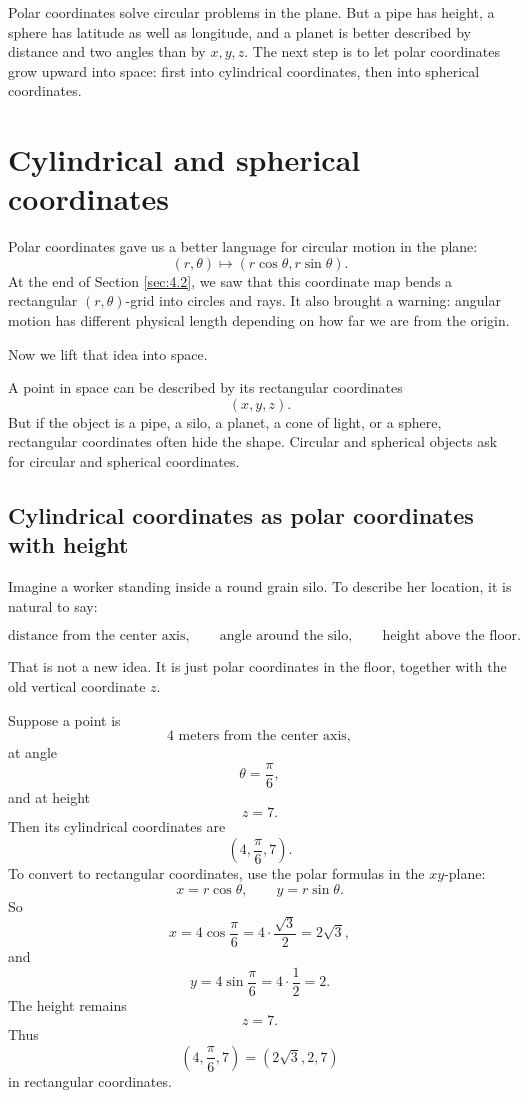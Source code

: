 Polar coordinates solve circular problems in the plane.  But a pipe has height, a sphere
has latitude as well as longitude, and a planet is better described by distance and two
angles than by \(x,y,z\).  The next step is to let polar coordinates grow upward into
space: first into cylindrical coordinates, then into spherical coordinates.
\section{Cylindrical and spherical coordinates}
\label{sec:4.3}

Polar coordinates gave us a better language for circular motion in the plane:
\[
    (r,\theta)\longmapsto (r\cos\theta,r\sin\theta).
\]
At the end of Section \ref{sec:4.2}, we saw that this coordinate map bends a rectangular
\((r,\theta)\)-grid into circles and rays.  It also brought a warning: angular motion has
different physical length depending on how far we are from the origin.

Now we lift that idea into space.

A point in space can be described by its rectangular coordinates
\[
    (x,y,z).
\]
But if the object is a pipe, a silo, a planet, a cone of light, or a sphere, rectangular
coordinates often hide the shape.  Circular and spherical objects ask for circular and
spherical coordinates.

\subsection{Cylindrical coordinates as polar coordinates with height}

Imagine a worker standing inside a round grain silo.  To describe her location, it is
natural to say:

\[
    \text{distance from the center axis},\qquad
    \text{angle around the silo},\qquad
    \text{height above the floor}.
\]

That is not a new idea.  It is just polar coordinates in the floor, together with the old
vertical coordinate \(z\).

\begin{example}
Suppose a point is
\[
    4 \text{ meters from the center axis},
\]
at angle
\[
    \theta=\frac{\pi}{6},
\]
and at height
\[
    z=7.
\]
Then its cylindrical coordinates are
\[
    \left(4,\frac{\pi}{6},7\right).
\]
To convert to rectangular coordinates, use the polar formulas in the \(xy\)-plane:
\[
    x=r\cos\theta,\qquad y=r\sin\theta.
\]
So
\[
    x=4\cos\frac{\pi}{6}=4\cdot\frac{\sqrt3}{2}=2\sqrt3,
\]
and
\[
    y=4\sin\frac{\pi}{6}=4\cdot\frac12=2.
\]
The height remains
\[
    z=7.
\]
Thus
\[
    \left(4,\frac{\pi}{6},7\right)
    =
    (2\sqrt3,2,7)
\]
in rectangular coordinates.
\end{example}

